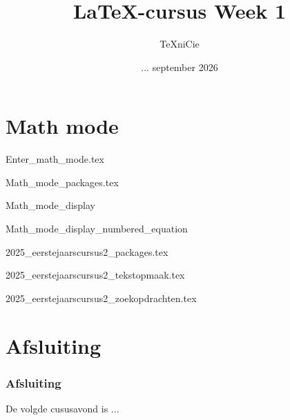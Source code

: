 \documentclass[allauthors,dutch]{../../../cursuspresentatie3}
\title{\LaTeX{}-cursus Week 1}
\author{\TeX niCie}
\date{... september 2026}
\def\importslide#1#2{%
	{#2}
}
\def\importslidej#1#2{%
	{#2}
}
\begin{document}
\section{Math mode}

\importslide{2025-eerstejaars_cursus_1}{Enter_math_mode.tex}
\importslide{2025-eerstejaars_cursus_1}{Math_mode_packages.tex}
\importslide{2025-eerstejaars_cursus_1}{Math_mode_display}
\importslide{2025-eerstejaars_cursus_1}{Math_mode_display_numbered_equation}

\importslidej{cursus2}{2025_eerstejaarscursus2_packages.tex}
\importslidej{cursus2}{2025_eerstejaarscursus2_tekstopmaak.tex}
\importslidej{cursus2}{2025_eerstejaarscursus2_zoekopdrachten.tex}

\section{Afsluiting}
\begin{frame}
	\frametitle{Afsluiting}
	
	De volgde cususavond is ...
\end{frame}
	
\end{document}
